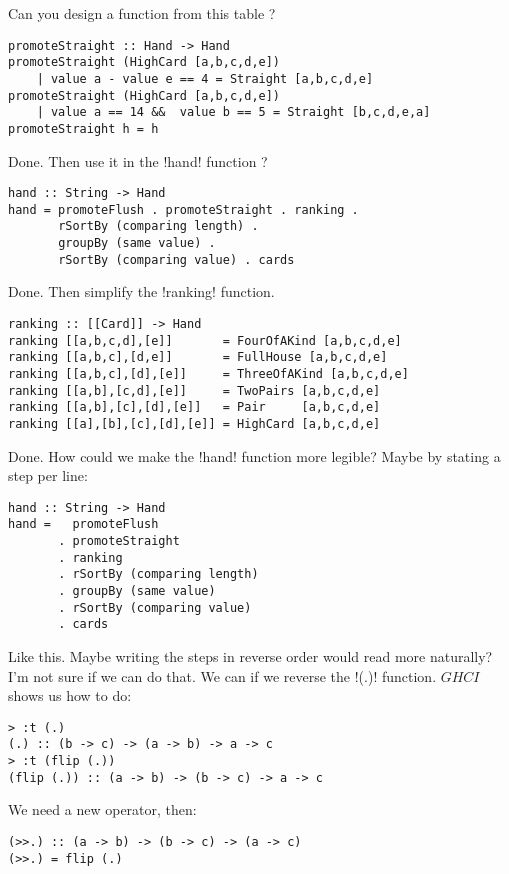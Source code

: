 \lhN Can you design a function from this table ?
\lhA
\begin{lstlisting}[frame=single]
promoteStraight :: Hand -> Hand
promoteStraight (HighCard [a,b,c,d,e]) 
    | value a - value e == 4 = Straight [a,b,c,d,e]
promoteStraight (HighCard [a,b,c,d,e]) 
    | value a == 14 &&  value b == 5 = Straight [b,c,d,e,a]
promoteStraight h = h
\end{lstlisting}
\success Done.
\lhN Then use it in the \il!hand! function ?
\lhA
\begin{lstlisting}[frame=single]
hand :: String -> Hand
hand = promoteFlush . promoteStraight . ranking . 
       rSortBy (comparing length) .
       groupBy (same value) . 
       rSortBy (comparing value) . cards
\end{lstlisting}
\success Done.
\lhN Then simplify the \il!ranking! function.
\lhA
\begin{lstlisting}[frame=single]
ranking :: [[Card]] -> Hand
ranking [[a,b,c,d],[e]]       = FourOfAKind [a,b,c,d,e]
ranking [[a,b,c],[d,e]]       = FullHouse [a,b,c,d,e]
ranking [[a,b,c],[d],[e]]     = ThreeOfAKind [a,b,c,d,e]
ranking [[a,b],[c,d],[e]]     = TwoPairs [a,b,c,d,e]
ranking [[a,b],[c],[d],[e]]   = Pair     [a,b,c,d,e]
ranking [[a],[b],[c],[d],[e]] = HighCard [a,b,c,d,e] 
\end{lstlisting}
\success Done.
\lhN How could we make the \il!hand! function more legible?
\lhA Maybe by stating a step per line:
\begin{lstlisting}[frame=single]
hand :: String -> Hand
hand =   promoteFlush    
       . promoteStraight
       . ranking 
       . rSortBy (comparing length)
       . groupBy (same value)
       . rSortBy (comparing value)
       . cards                     
\end{lstlisting}
\success Like this.
\lhN Maybe writing the steps in reverse order would read more naturally?
\lhA I'm not sure if we can do that.
\newpage
\lhN We can if we reverse the \il!(.)! function. $GHCI$ shows us how to do:
\begin{small}
\begin{verbatim}
> :t (.)
(.) :: (b -> c) -> (a -> b) -> a -> c
> :t (flip (.))
(flip (.)) :: (a -> b) -> (b -> c) -> a -> c
\end{verbatim}
\end{small}
\hspace*{\fill}
\lhA We need a new operator, then:
\begin{lstlisting}[frame=single]
(>>.) :: (a -> b) -> (b -> c) -> (a -> c)
(>>.) = flip (.)
\end{lstlisting}
